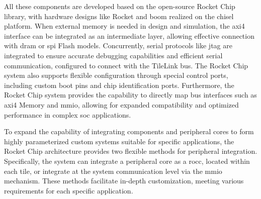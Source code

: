 

All these components are developed based on the open-source Rocket Chip library, with hardware designs like Rocket and \acrshort{boom} realized on the \acrshort{chisel} platform. When external memory is needed in design and simulation, the \acrfull{axi4} interface can be integrated as an intermediate layer, allowing effective connection with \acrshort{dram} or \acrshort{spi} Flash models. Concurrently, serial protocols like \acrshort{jtag} are integrated to ensure accurate debugging capabilities and efficient serial communication, configured to connect with the TileLink bus. The Rocket Chip system also supports flexible configuration through special control ports, including custom boot pins and chip identification ports. Furthermore, the Rocket Chip system provides the capability to directly map bus interfaces such as \acrshort{axi4} Memory and \acrfull{mmio}, allowing for expanded compatibility and optimized performance in complex \acrshort{soc} applications.

To expand the capability of integrating components and peripheral cores to form highly parameterized custom systems suitable for specific applications, the Rocket Chip architecture provides two flexible methods for peripheral integration. Specifically, the system can integrate a peripheral core as a \acrfull{rocc}, located within each tile, or integrate at the system communication level via the \acrshort{mmio} mechanism. These methods facilitate in-depth customization, meeting various requirements for each specific application.

